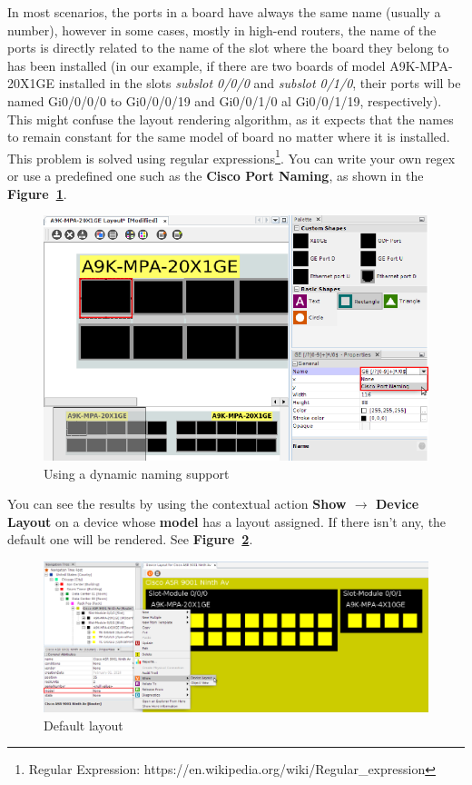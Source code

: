 \documentclass[a4paper]{article}
\begin{document}
	In most scenarios, the ports in a board have always the same name (usually a number), however in some cases, mostly in high-end routers, the name of the ports is directly related to the name of the slot where the board they belong to has been installed (in our example, if there are two boards of model A9K-MPA-20X1GE installed in the slots \textit{subslot 0/0/0} and \textit{subslot 0/1/0}, their ports will be named  Gi0/0/0/0 to Gi0/0/0/19 and  Gi0/0/1/0 al Gi0/0/1/19, respectively). This might confuse the layout rendering algorithm, as it expects that the names to remain constant for the same model of board no matter where it is installed. This problem is solved using regular expressions\footnote{Regular Expression: https://en.wikipedia.org/wiki/Regular\_expression}. You can write your own regex or use a predefined one such as the \textbf{Cisco Port Naming}, as shown in the \textbf{Figure~\ref{fig:device_layout_port_naming}}.
	
	\begin{figure}[h!]
		\centering
		\includegraphics[width=0.99\linewidth]{img/device_layout_port_naming.png}
		\caption{Using a dynamic naming support}
		\label{fig:device_layout_port_naming}
	\end{figure}
    \newpage
	
	You can see the results by using the contextual action \textbf{Show $\rightarrow$ Device Layout} on a device whose \textbf{model} has a layout assigned. If there isn't any, the default one will be rendered. See \textbf{Figure~\ref{fig:device_layout_default}}.
	
	\begin{figure}[h!]
		\centering
		\includegraphics[width=0.99\linewidth]{img/device_layout_default.png}
		\caption{Default layout}
		\label{fig:device_layout_default}
	\end{figure}
	
\end{document}
